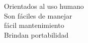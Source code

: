 \documentclass[preview]{standalone}
\begin{document}
Orientados al uso humano\\Son fáciles de manejar\\fácil mantenimiento\\Brindan portabilidad\\
\end{document}
